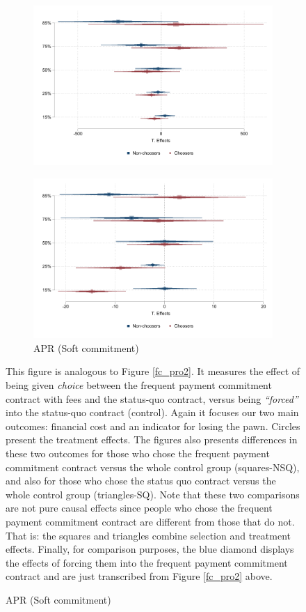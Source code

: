 \documentclass[oneside,11pt]{article}
\begin{document}
\begin{figure}[H]
\begin{center}
\begin{subfigure}{.45\textwidth}
        \includegraphics[width=\textwidth]{Figuras/qreg_soft_fc_admin.pdf}
    \end{subfigure}
     \begin{subfigure}{0.45\textwidth}
      \caption{APR (Soft commitment)}
       \centering
      \includegraphics[width=\textwidth]{Figuras/qreg_soft_apr.pdf}
    \end{subfigure}    
    \end{center}
        \scriptsize
        This figure is analogous to Figure \ref{fc_pro2}. It measures the effect of being given \textit{choice} between the frequent payment commitment contract with fees and the status-quo contract, versus being \textit{``forced''} into the status-quo contract (control). Again it focuses our two main outcomes: financial cost and an indicator for losing the pawn. Circles present the treatment effects. The figures also presents differences in these two outcomes for those who chose the frequent payment commitment contract versus the whole control group (squares-NSQ), and also for those who chose the status quo contract versus the whole control group (triangles-SQ). Note that these two comparisons are not pure causal effects since people who chose the frequent payment commitment contract are different from those that do not. That is: the squares and triangles combine selection and treatment effects. Finally, for comparison purposes, the blue diamond displays the effects of forcing them into the frequent payment commitment contract and are just transcribed from Figure \ref{fc_pro2} above. 

\end{figure}
\end{document}
